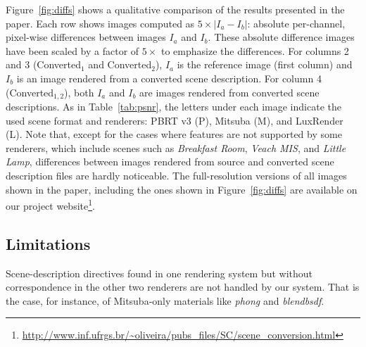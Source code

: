	Figure~\ref{fig:diffs} shows a qualitative comparison of the results presented in the paper. Each row shows images computed as $5\times|I_a - I_b|$: absolute per-channel, pixel-wise differences between images $I_a$ and $I_b$. These absolute difference images have been scaled by a factor of $5\times$ to emphasize the differences. For columns 2 and 3 (Converted$_1$ and Converted$_2$), $I_a$ is the reference image (first column) and $I_b$ is an image rendered from a converted scene description. For column 4 (Converted$_{1,2}$), both $I_a$ and $I_b$ are images rendered from converted scene descriptions. As in Table~\ref{tab:psnr}, the letters under each image indicate the used scene format and renderers: PBRT v3 (P), Mitsuba (M), and LuxRender (L).    
	Note that, except for the cases where features are not supported by some renderers, which include scenes such as \emph{Breakfast Room}, \emph{Veach MIS}, and \emph{Little Lamp}, differences between images rendered from source and converted scene description files are hardly noticeable. The full-resolution versions of all images shown in the paper, including the ones shown in Figure~\ref{fig:diffs} are available on our project website\footnote{\url{http://www.inf.ufrgs.br/~oliveira/pubs_files/SC/scene_conversion.html}}.   
%	




\subsection{Limitations}
Scene-description directives found in one rendering system but without correspondence in the other two renderers are not handled by our system. That is the case, for instance, of Mitsuba-only materials like \textit{phong} and \textit{blendbsdf}. 

